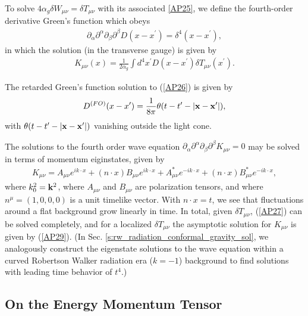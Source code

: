 To solve $4\alpha_g \delta W_{\mu\nu} = \delta T_{\mu\nu}$ with its associated \eqref{AP25}, we define the fourth-order derivative Green's function which obeys
%
\begin{eqnarray}
\partial_{\alpha}\partial^{\alpha} \partial_{\beta}\partial^{\beta}D(x-x^{\prime})=\delta^4(x-x^{\prime}),
\label{AP26}
\end{eqnarray}
%
in which the solution (in the transverse gauge) is given by 
%
\begin{eqnarray}
K_{\mu\nu}(x)=\frac{1}{2\alpha_g}\int d^4x^{\prime}D(x-x^{\prime})\delta T_{\mu\nu}(x^{\prime}).
\label{AP27}
\end{eqnarray}
%

The retarded Green's function  solution to (\ref{AP26}) \cite{mannheim_2007} is given by
%
\begin{eqnarray}
D^{(FO)}(x-x^{\prime})=\frac{1}{8\pi}\theta (t-t^{\prime}-|{\bf x}-{\bf x}^{\prime}|),
\label{AP28}
\end{eqnarray}
%
with $\theta (t-t^{\prime}-|{\bf x}-{\bf x}^{\prime}|)$ vanishing outside the light cone. 

The solutions to the fourth order wave equation $\partial_{\alpha}\partial^{\alpha} \partial_{\beta}\partial^{\beta}K_{\mu \nu}=0$ may be solved in terms of momentum eiginstates, given by \cite{riegert_1984a,mannheim_2012}
%
\begin{eqnarray}
K_{\mu\nu}=A_{\mu\nu}e^{ik\cdot x}+(n\cdot x)B_{\mu\nu}e^{ik\cdot x}+A^*_{\mu\nu}e^{-ik\cdot x}+(n\cdot x)B^*_{\mu\nu}e^{-ik\cdot x},
\label{AP29}
\end{eqnarray}
%
where $k_0^2={\bf k}^2$, where $A_{\mu\nu}$ and $B_{\mu\nu}$ are polarization tensors, and where $n^{\mu}=(1,0,0,0)$ is a unit timelike vector.  With $n\cdot x=t$, we see that fluctuations around a flat background grow linearly in time. In total, given $\delta T_{\mu\nu}$, (\ref{AP27}) can be solved completely, and for a localized $\delta T_{\mu\nu}$ the asymptotic solution for $K_{\mu\nu}$ is given by (\ref{AP29}). (In Sec. \ref{s:rw_radiation_conformal_gravity_sol}, we analogously construct the eigenstate solutions to the wave equation within a curved Robertson Walker radiation era ($k=-1$) background to find solutions with leading time behavior of $t^4$.) 
%
\subsection{On the Energy Momentum Tensor}
\label{ss:on_the_energy_momentum_tensor}

